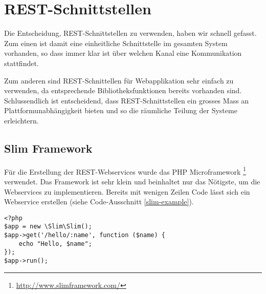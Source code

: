 \section{REST-Schnittstellen}
Die Entscheidung, \gls{REST}-Schnittstellen zu verwenden, haben wir schnell gefasst. 
Zum einen ist damit eine einheitliche Schnittstelle im gesamten System vorhanden, so dass immer klar ist über welchen Kanal eine Kommunikation stattfindet.

Zum anderen sind \gls{REST}-Schnittellen für Webapplikation sehr einfach zu verwenden, da entsprechende Bibliotheksfunktionen bereits vorhanden sind.
Schlussendlich ist entscheidend, dass \gls{REST}-Schnittstellen ein grosses Mass an Plattformunabhängigkeit bieten und so die räumliche Teilung der Systeme erleichtern.

\subsection{Slim Framework}
Für die Erstellung der \gls{REST}-Webservices wurde das PHP Microframework \footnote{\url{http://www.slimframework.com/}} verwendet.
Das Framework ist sehr klein und beinhaltet nur das Nötigste, um die Webservices zu implementieren.
Bereits mit wenigen Zeilen Code lässt sich ein Webservice erstellen (siehe Code-Ausschnitt \ref{slim-example}).

\lstset{language=PHP}
\begin{lstlisting}[caption=Beispiel REST-Webservice in Slim, label=slim-example]
<?php
$app = new \Slim\Slim();
$app->get('/hello/:name', function ($name) {
    echo "Hello, $name";
});
$app->run();
\end{lstlisting}













